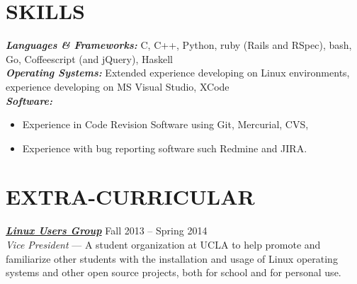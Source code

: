 \documentclass[line,letterpaper]{resume}
\begin{document}
\begin{resume}
    \vspace{-15pt}

    \section{\uppercase{Skills}}
    {\sl\textbf{Languages \& Frameworks:}}\/
    C, C++, Python, ruby (Rails and RSpec), bash, Go, Coffeescript (and jQuery),
	Haskell\\
    {\sl\textbf{Operating Systems:}}\/
	Extended experience developing on Linux environments, experience developing on
	MS Visual Studio, XCode \\
    {\sl\textbf{Software:}}\/
	\begin{itemize}
	\item Experience in Code Revision Software using Git, Mercurial, CVS,
	\item Experience with bug reporting software such Redmine and JIRA.
	\end{itemize}
    \vspace{-6pt}
    \section{\uppercase{Extra-Curricular}}
    {\sl\textbf{\href{linux.ucla.edu}{Linux Users Group}}} \hfill Fall 2013 -- Spring 2014\\
    \emph{Vice President} --- A student organization at UCLA to help promote
	and familiarize other students with the installation and usage of Linux
	operating systems and other open source projects, both for school and for personal use.

\end{resume}
\end{document}
